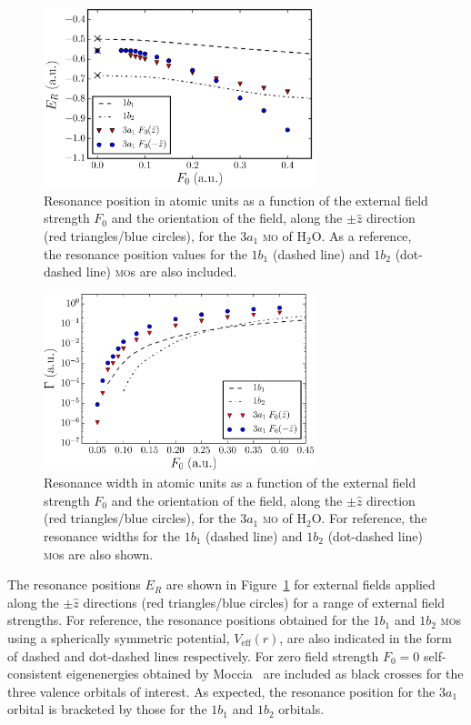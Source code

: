 \begin{figure}
  \centering
  \includegraphics[width=0.7\textwidth]{figures/ch_H2O/3a1/resPosvsForbitals_compf32snew.eps}
  \caption{Resonance position in atomic units as a function of the
    external field strength $F_{0}$ and the orientation of the field,
    along the $\pm\hat{z}$ direction (red triangles/blue circles), for
    the $3a_{1}$ \textsc{mo} of H$_{2}$O. As a reference, the resonance
    position values for the $1b_{1}$ (dashed line) and $1b_{2}$
    (dot-dashed line) \textsc{mo}s are also included.}
  \label{fig:3a1_position}
\end{figure}

\begin{figure}
  \centering
  \includegraphics[width=0.7\textwidth]{figures/ch_H2O/3a1/resWidthvsForbitals_compf32snew.eps}
  \caption{Resonance width in atomic units as a function of the
    external field strength $F_{0}$ and the orientation of the field,
    along the $\pm\hat{z}$ direction (red triangles/blue circles), for
    the $3a_{1}$ \textsc{mo} of H$_{2}$O. For reference, the resonance
    widths for the $1b_{1}$ (dashed line) and $1b_{2}$ (dot-dashed
    line) \textsc{mo}s are also shown.}
  \label{fig:3a1_width}
\end{figure}

The resonance positions $E_{R}$ are shown in
Figure~\ref{fig:3a1_position} for external fields applied along the
$\pm\hat{z}$ directions (red triangles/blue circles) for a range of
external field strengths. For reference, the resonance positions
obtained for the $1b_{1}$ and $1b_{2}$ \textsc{mo}s using a
spherically symmetric potential, $V_{\mathrm{eff}}(r)$, are also
indicated in the form of dashed and dot-dashed lines respectively. For
zero field strength $F_{0} = 0$ self-consistent eigenenergies obtained
by Moccia~\cite{Moccia_1964} are included as black crosses for the
three valence orbitals of interest. As expected, the resonance
position for the $3a_{1}$ orbital is bracketed by those for the
$1b_{1}$ and $1b_{2}$ orbitals.

